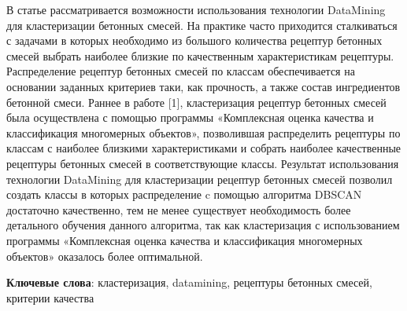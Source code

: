 В статье рассматривается возможности использования технологии DataMining
для кластеризации бетонных смесей. На практике часто приходится
сталкиваться с задачами в которых необходимо из большого количества
рецептур бетонных смесей выбрать наиболее близкие по качественным
характеристикам рецептуры. Распределение рецептур бетонных смесей по
классам обеспечивается на основании заданных критериев таки, как
прочность, а также состав ингредиентов бетонной смеси. Раннее в работе
{[}1{]}, кластеризация рецептур бетонных смесей была осуществлена с
помощью программы «Комплексная оценка качества и классификация
многомерных объектов», позволившая распределить рецептуры по классам с
наиболее близкими характеристиками и собрать наиболее качественные
рецептуры бетонных смесей в соответствующие классы. Результат
использования технологии DataMining для кластеризации рецептур бетонных
смесей позволил создать классы в которых распределение c помощью
алгоритма DBSCAN достаточно качественно, тем не менее существует
необходимость более детального обучения данного алгоритма, так как
кластеризация с использованием программы «Комплексная оценка качества и
классификация многомерных объектов» оказалось более оптимальной.

{\bfseries Ключевые слова}: кластеризация, datamining, рецептуры бетонных
смесей, критерии качества

